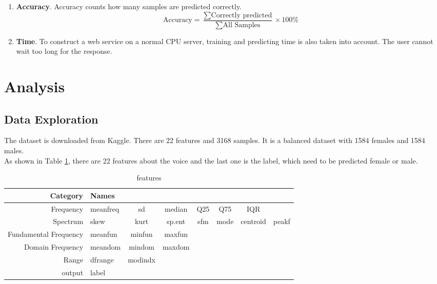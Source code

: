 \documentclass[12pt,a4paper]{article}
\theoremstyle{definition}
\begin{document}
\begin{enumerate}
    \item \textbf{Accuracy}. Accuracy counts how many samples are predicted correctly.
        $$ \text{Accuracy} = \frac{\sum \text{Correctly predicted}}{{\sum \text{All Samples}}} \times 100 \% $$
    
    \item \textbf{Time}. To construct a web service on a normal CPU server, training and predicting time is also taken into account. The user cannot wait too long for the response.
\end{enumerate}

\section{Analysis}
\subsection{Data Exploration}

The dataset is downloaded from Kaggle. There are 22 features and 3168 samples. It is a balanced dataset with 1584 females and 1584 males.\\

\noindent
As shown in Table \ref{tab:feature_table}, there are 22 features about the voice and the last one is the label, which need to be predicted female or male. \\
\begin{table}[htbp]
    \centering
    \begin{tabular}{r|lcccccc}
        Category              & Names    \\
        \hline
        Frequency             & meanfreq  & sd       & median & Q25  & Q75  & IQR      \\
        Spectrum              & skew      & kurt     & sp.ent & sfm  & mode & centroid  & peakf \\
        Fundamental Frequency & meanfun   & minfun   & maxfun &     \\
        Domain Frequency      & meandom   & mindom   & maxdom &     \\
        Range                 & dfrange   & modindx \\
        output                & label    \\
    \end{tabular}
    \caption{\label{tab:feature_table}features}
\end{table}
\end{document}
